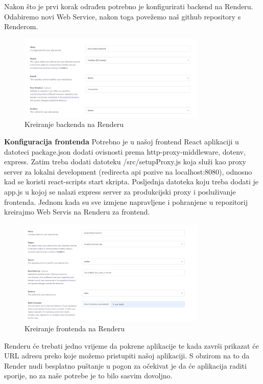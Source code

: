 		Nakon što je prvi korak odrađen potrebno je konfigurirati backend na Renderu. Odabiremo novi Web Service, nakon toga povežemo naš github repository s Renderom. 
		
		\begin{figure}[h]
			\centering
			\includegraphics[width=0.8\textwidth]{slike/pustanju_u_pogon_4.jpg}
			\caption{Kreiranje backenda na Renderu}
			\label{fig:backend_render}
		\end{figure}
		
		\textbf{Konfiguracija frontenda}
		Potrebno je u našoj frontend React aplikaciji u datoteci package.json dodati ovisnosti prema http-proxy-middleware, dotenv, express. Zatim treba dodati datoteku /src/setupProxy.js koja služi kao proxy server za lokalni development (redirecta api pozive na localhost:8080), odnosno kad se koristi react-scripts start skripta. Posljednja datoteka koju treba dodati je app.js u kojoj se nalazi express server za produkcijski proxy i posluživanje frontenda. Jednom kada su sve izmjene napravljene i pohranjene u repozitorij kreirajmo Web Servis na Renderu za frontend. 
			
		\begin{figure}[h]
			\centering
			\includegraphics[width=0.8\textwidth]{slike/pustanju_u_pogon_5.jpg}
			\caption{Kreiranje frontenda na Renderu}
			\label{fig:frontend_render}
		\end{figure}
		
		Renderu će trebati jedno vrijeme da pokrene aplikacije te kada završi prikazat će URL adresu preko koje možemo pristupiti našoj aplikaciji. S obzirom na to da Render nudi besplatno puštanje u pogon za očekivat je da će aplikacija raditi sporije, no za naše potrebe je to bilo sasvim dovoljno.